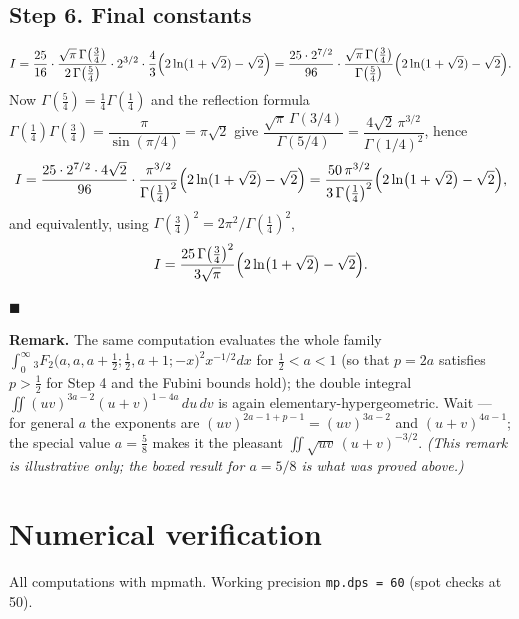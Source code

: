 \documentclass[11pt]{article}
\theoremstyle{remark}
\begin{document}
\subsection*{Step 6. Final constants}

$$
I=\frac{25}{16}\cdot\frac{\sqrt\pi\,\Gamma\!\left(\tfrac34\right)}{2\,\Gamma\!\left(\tfrac54\right)}\cdot 2^{3/2}\cdot\frac43\Bigl(2\ln(1+\sqrt2)-\sqrt2\Bigr)
=\frac{25\cdot 2^{7/2}}{96}\cdot\frac{\sqrt\pi\,\Gamma\!\left(\tfrac34\right)}{\Gamma\!\left(\tfrac54\right)}\Bigl(2\ln(1+\sqrt2)-\sqrt2\Bigr).
$$
Now $\Gamma\!\left(\tfrac54\right)=\tfrac14\Gamma\!\left(\tfrac14\right)$ and the reflection formula $\Gamma\!\left(\tfrac14\right)\Gamma\!\left(\tfrac34\right)=\dfrac{\pi}{\sin(\pi/4)}=\pi\sqrt2$ give
$\dfrac{\sqrt\pi\,\Gamma(3/4)}{\Gamma(5/4)}=\dfrac{4\sqrt2\,\pi^{3/2}}{\Gamma(1/4)^2}$, hence
$$
I=\frac{25\cdot2^{7/2}\cdot 4\sqrt2}{96}\cdot\frac{\pi^{3/2}}{\Gamma\!\left(\tfrac14\right)^2}\Bigl(2\ln(1+\sqrt2)-\sqrt2\Bigr)
=\frac{50\,\pi^{3/2}}{3\,\Gamma\!\left(\tfrac14\right)^2}\Bigl(2\ln\bigl(1+\sqrt2\bigr)-\sqrt2\Bigr),
$$
and equivalently, using $\Gamma(\tfrac34)^2=2\pi^2/\Gamma(\tfrac14)^2$,
$$
I=\frac{25\,\Gamma\!\left(\tfrac34\right)^2}{3\sqrt\pi}\Bigl(2\ln\bigl(1+\sqrt2\bigr)-\sqrt2\Bigr).
$$

$\blacksquare$

\textbf{Remark.} The same computation evaluates the whole family
$\int_0^\infty {}_3F_2\bigl(a,a,a+\tfrac12;\tfrac12,a+1;-x\bigr)^2 x^{-1/2}dx$ for $\tfrac12<a<1$ (so that $p=2a$ satisfies $p>\tfrac12$ for Step 4 and the Fubini bounds hold); the double integral $\iint (uv)^{3a-2}(u+v)^{1-4a}\,du\,dv$ is again elementary-hypergeometric. Wait — for general $a$ the exponents are $(uv)^{2a-1+p-1}=(uv)^{3a-2}$ and $(u+v)^{4a-1}$; the special value $a=\tfrac58$ makes it the pleasant $\iint\sqrt{uv}\,(u+v)^{-3/2}$. \emph{(This remark is illustrative only; the boxed result for $a=5/8$ is what was proved above.)}

\section*{Numerical verification}

All computations with mpmath. Working precision \texttt{mp.dps = 60} (spot checks at 50).
\end{document}
